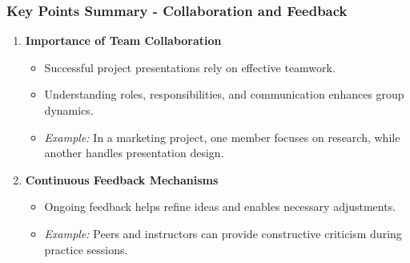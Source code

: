 \documentclass[aspectratio=169]{beamer}
\begin{document}
\begin{frame}[fragile]
    \frametitle{Key Points Summary - Collaboration and Feedback}
    \begin{enumerate}
        \item \textbf{Importance of Team Collaboration}
        \begin{itemize}
            \item Successful project presentations rely on effective teamwork.
            \item Understanding roles, responsibilities, and communication enhances group dynamics.
            \item \textit{Example:} In a marketing project, one member focuses on research, while another handles presentation design.
        \end{itemize}
        
        \item \textbf{Continuous Feedback Mechanisms}
        \begin{itemize}
            \item Ongoing feedback helps refine ideas and enables necessary adjustments.
            \item \textit{Example:} Peers and instructors can provide constructive criticism during practice sessions.
        \end{itemize}
    \end{enumerate}
\end{frame}
\end{document}
